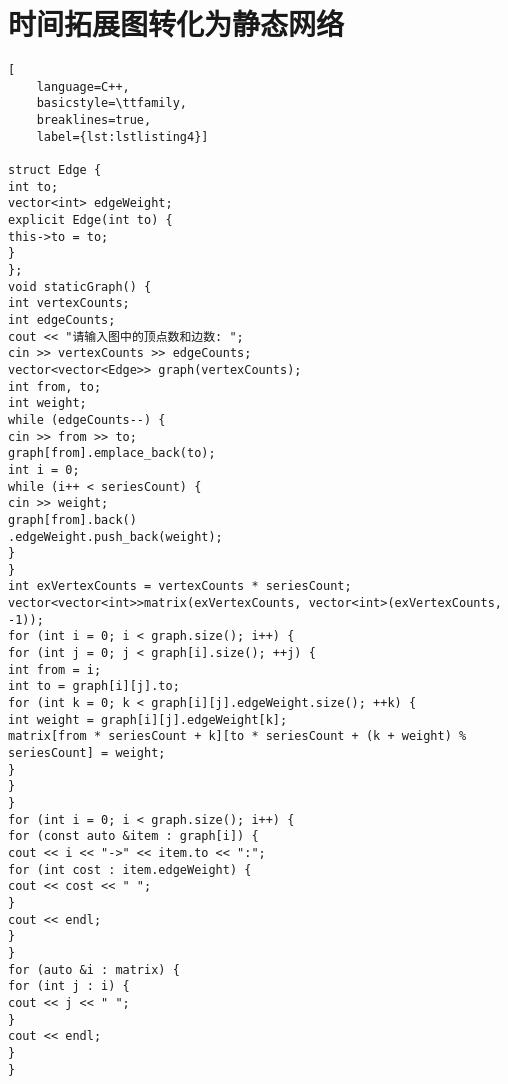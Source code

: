 \chapter{时间拓展图转化为静态网络}\label{ch:时间拓展图转化为静态网络}
\begin{lstlisting}[
    language=C++,
    basicstyle=\ttfamily,
    breaklines=true,
    label={lst:lstlisting4}]

struct Edge {
int to;
vector<int> edgeWeight;
explicit Edge(int to) {
this->to = to;
}
};
void staticGraph() {
int vertexCounts;
int edgeCounts;
cout << "请输入图中的顶点数和边数: ";
cin >> vertexCounts >> edgeCounts;
vector<vector<Edge>> graph(vertexCounts);
int from, to;
int weight;
while (edgeCounts--) {
cin >> from >> to;
graph[from].emplace_back(to);
int i = 0;
while (i++ < seriesCount) {
cin >> weight;
graph[from].back()
.edgeWeight.push_back(weight);
}
}
int exVertexCounts = vertexCounts * seriesCount;
vector<vector<int>>matrix(exVertexCounts, vector<int>(exVertexCounts, -1));
for (int i = 0; i < graph.size(); i++) {
for (int j = 0; j < graph[i].size(); ++j) {
int from = i;
int to = graph[i][j].to;
for (int k = 0; k < graph[i][j].edgeWeight.size(); ++k) {
int weight = graph[i][j].edgeWeight[k];
matrix[from * seriesCount + k][to * seriesCount + (k + weight) % seriesCount] = weight;
}
}
}
for (int i = 0; i < graph.size(); i++) {
for (const auto &item : graph[i]) {
cout << i << "->" << item.to << ":";
for (int cost : item.edgeWeight) {
cout << cost << " ";
}
cout << endl;
}
}
for (auto &i : matrix) {
for (int j : i) {
cout << j << " ";
}
cout << endl;
}
}
\end{lstlisting}


